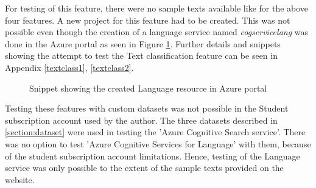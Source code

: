 \begin{itemize}
    For testing of this feature, there were no sample texts available like for the above four features. A new project for this feature had to be created. This was not possible even though the creation of a language service named \textit{cogservicelang} was done in the Azure portal as seen in Figure \ref{langres}. Further details and snippets showing the attempt to test the Text classification feature can be seen in Appendix \ref{textclass1}, \ref{textclass2}.
    \begin {figure}[h!h]
        \centering
        \caption{Snippet showing the created Language resource in Azure portal}
        \label{langres}
    \end {figure}
\end{itemize}
Testing these features with custom datasets was not possible in the Student subscription account used by the author. The three datasets described in \ref{section:dataset} were used in testing the 'Azure Cognitive Search service'. There was no option to test 'Azure Cognitive Services for Language' with them, because of the student subscription account limitations. Hence, testing of the Language service was only possible to the extent of the sample texts provided on the website. 

